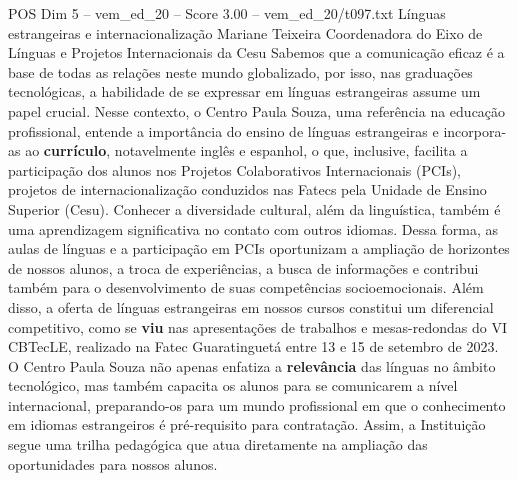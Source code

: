 \begin{textsample}{POS Dim 5 – vem\_ed\_20 – Score 3.00 – vem\_ed\_20/t097.txt}  \label{ex:f5_pos_108}
Línguas estrangeiras e internacionalização Mariane Teixeira Coordenadora do Eixo de Línguas e Projetos Internacionais da Cesu Sabemos que a comunicação eficaz é a base de todas as relações neste mundo globalizado, por isso, nas graduações tecnológicas, a habilidade de se expressar em línguas estrangeiras assume um papel crucial.
Nesse contexto, o Centro Paula Souza, uma referência na educação profissional, entende a importância do ensino de línguas estrangeiras e incorpora-as ao \textbf{currículo}, notavelmente inglês e espanhol, o que, inclusive, facilita a participação dos alunos nos Projetos Colaborativos Internacionais (PCIs), projetos de internacionalização conduzidos nas Fatecs pela Unidade de Ensino Superior (Cesu).
Conhecer a diversidade cultural, além da linguística, também é uma aprendizagem significativa no contato com outros idiomas.
Dessa forma, as aulas de línguas e a participação em PCIs oportunizam a ampliação de horizontes de nossos alunos, a troca de experiências, a busca de informações e contribui também para o desenvolvimento de suas competências socioemocionais.
Além disso, a oferta de línguas estrangeiras em nossos cursos constitui um diferencial competitivo, como se \textbf{viu} nas apresentações de trabalhos e mesas-redondas do VI CBTecLE, realizado na Fatec Guaratinguetá entre 13 e 15 de setembro de 2023.
O Centro Paula Souza não apenas enfatiza a \textbf{relevância} das línguas no âmbito tecnológico, mas também capacita os alunos para se comunicarem a nível internacional, preparando-os para um mundo profissional em que o conhecimento em idiomas estrangeiros é pré-requisito para contratação.
Assim, a Instituição segue uma trilha pedagógica que atua diretamente na ampliação das oportunidades para nossos alunos.

\end{textsample}
